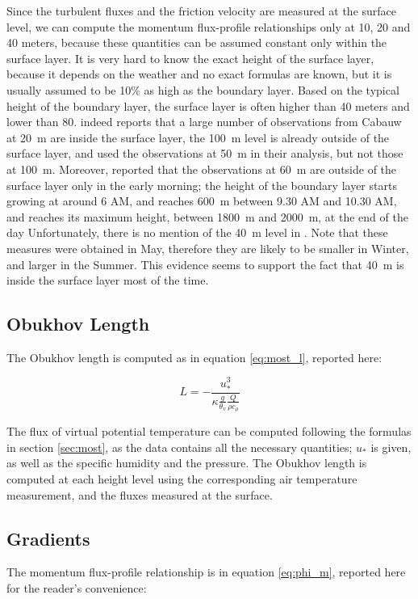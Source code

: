 \documentclass[a4paper,11pt]{kth-mag}
\begin{document}
Since the turbulent fluxes and the friction velocity are measured at the surface level, we can compute the momentum flux-profile relationships only at 10, 20 and 40 meters, because these quantities can be assumed constant only within the surface layer. It is very hard to know the exact height of the surface layer, because it depends on the weather and no exact formulas are known, but it is usually assumed to be 10\% as high as the boundary layer. Based on the typical height of the boundary layer, the surface layer is often higher than 40 meters and lower than 80. \cite{cabauw_z0} indeed reports that a large number of observations from Cabauw at \SI{20}{\meter} are inside the surface layer, the \SI{100}{\meter} level is already outside of the surface layer, and \cite{boulder} used the observations at \SI{50}{\meter} in their analysis, but not those at \SI{100}{\meter}. Moreover, \cite{cabauw60m} reported that the observations at \SI{60}{\meter} are outside of the surface layer only in the early morning; the height of the boundary layer starts growing at around 6 AM, and reaches \SI{600}{\meter} between 9.30 AM and 10.30 AM, and reaches its maximum height, between \SI{1800}{\meter} and \SI{2000}{\meter}, at the end of the day Unfortunately, there is no mention of the \SI{40}{\meter} level in \cite{cabauw60m}. Note that these measures were obtained in May, therefore they are likely to be smaller in Winter, and larger in the Summer. This evidence seems to support the fact that \SI{40}{\meter} is inside the surface layer most of the time.

\subsection{Obukhov Length}

The Obukhov length is computed as in equation \ref{eq:most_l}, reported here:

$$
L=-\frac{u_*^3}{\kappa\frac{g}{\theta_v}\frac{Q}{\rho c_\rho}}
$$

The flux of virtual potential temperature can be computed following the formulas in section \ref{sec:most}, as the data contains all the necessary quantities; $u_*$ is given, as well as the specific humidity and the pressure. The Obukhov length is computed at each height level using the corresponding air temperature measurement, and the fluxes measured at the surface.


\subsection{Gradients}
\label{sec:gradients}
The momentum flux-profile relationship is in equation \ref{eq:phi_m}, reported here for the reader's convenience:
\end{document}
